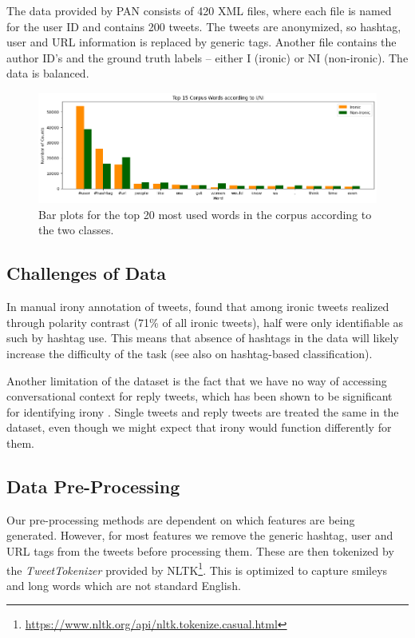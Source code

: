 
The data provided by PAN consists of 420 XML files, where each file is named for the user ID and contains 200 tweets. The tweets are anonymized, so hashtag, user and URL information is replaced by generic tags. Another file contains the author ID's and the ground truth labels -- either I (ironic) or NI (non-ironic). The data is balanced. 

\begin{figure}[!h]
    \centering
    \includegraphics[width=\textwidth]{images/word_counts_i_ni.png}
    \caption{Bar plots for the top 20 most used words in the corpus according to the two classes.}
    \label{fig:bar_word_counts}
\end{figure}

\subsection{Challenges of Data}

In manual irony annotation of tweets,  found that among ironic tweets realized through polarity contrast (71\% of all ironic tweets), half were only identifiable as such by hashtag use. This means that absence of hashtags in the data will likely increase the difficulty of the task (see also  on hashtag-based classification). 

Another limitation of the dataset is the fact that we have no way of accessing conversational context for reply tweets, which has been shown to be significant for identifying irony \cite{joshi2015harnessing, wallace2015sparse}. Single tweets and reply tweets are treated the same in the dataset, even though we might expect that irony would function differently for them. 

\subsection{Data Pre-Processing}

Our pre-processing methods are dependent on which features are being generated. However, for most features we remove the generic hashtag, user and URL tags from the tweets before processing them. These are then tokenized by the \emph{TweetTokenizer} provided by NLTK\footnote{\url{https://www.nltk.org/api/nltk.tokenize.casual.html}}. This is optimized to capture smileys and long words which are not standard English. 